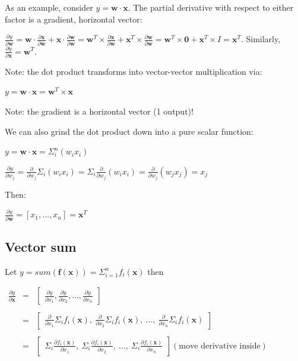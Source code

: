 \documentclass[11pt]{article}
\begin{document}
As an example, consider $y = \mathbf{w} \cdot \mathbf{x}$. The partial derivative with respect to either factor is a gradient, horizontal vector:

$\frac{\partial y}{\partial \mathbf{w}} = \mathbf{w} \cdot \frac{\partial \mathbf{x}}{\partial \mathbf{w}} + \mathbf{x} \cdot \frac{\partial \mathbf{w}}{\partial \mathbf{w}} = \mathbf{w}^T \times \frac{\partial \mathbf{x}}{\partial \mathbf{w}} + \mathbf{x}^T \times \frac{\partial \mathbf{w}}{\partial \mathbf{w}} = \mathbf{w}^T \times \mathbf{0} + \mathbf{x}^T \times I = \mathbf{x}^T$. Similarly, $\frac{\partial y}{\partial \mathbf{x}} = \mathbf{w}^T$.

Note: the dot product transforms into vector-vector multiplication via:

$y = \mathbf{w} \cdot \mathbf{x} = \mathbf{w}^{T} \times \mathbf{x}$

Note: the gradient is a horizontal vector (1 output)!

We can also grind the dot product down into a pure scalar function:

$y = \mathbf{w} \cdot \mathbf{x} = \Sigma_i^n (w_i x_i)$

$\frac{\partial y}{\partial w_j} = \frac{\partial}{\partial w_j} \Sigma_i (w_i x_i) = \Sigma_i \frac{\partial}{\partial w_j} (w_i x_i) = \frac{\partial}{\partial w_j} (w_j x_j) = x_j$

Then:

$\frac{\partial y}{\partial \mathbf{w}} = [ x_1, \ldots, x_n ] = \mathbf{x}^T$

\subsection{Vector sum}

Let $y = sum( \mathbf{f}(\mathbf{x})) = \Sigma_{i=1}^n f_i(\mathbf{x})$ then

$
\begin{array}{lcl}
\frac{\partial y}{\partial \mathbf{x}} & = & \begin{bmatrix} \frac{\partial y}{\partial x_1}, \frac{\partial y}{\partial x_2}, \ldots, \frac{\partial y}{\partial x_n} \end{bmatrix}\\\\
 & = & \begin{bmatrix} \frac{\partial}{\partial x_1} \Sigma_i f_i(\mathbf{x}),~ \frac{\partial}{\partial x_2} \Sigma_i f_i(\mathbf{x}),~ \ldots,~ \frac{\partial}{\partial x_n} \Sigma_i  f_i(\mathbf{x}) \end{bmatrix} \\\\
 & = & \begin{bmatrix} \Sigma_i \frac{\partial f_i(\mathbf{x})}{\partial x_1},~ \Sigma_i \frac{\partial f_i(\mathbf{x})}{\partial x_2},~ \ldots,~ \Sigma_i \frac{\partial f_i(\mathbf{x})}{\partial x_n}  \end{bmatrix}(\text{move derivative inside})\\\\
\end{array}
$
\end{document}

